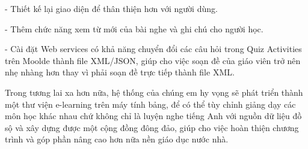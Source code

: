 \quad - Thiết kế lại giao diện để thân thiện hơn với người dùng.

\quad - Thêm chức năng xem từ mới của bài nghe và ghi chú cho người học.

\quad - Cài đặt Web services có khả năng chuyển đổi các câu hỏi trong Quiz Activities trên Moolde thành file XML/JSON, giúp cho việc soạn đề của giáo viên trở nên nhẹ nhàng hơn thay vì phải soạn đề trực tiếp thành file XML.

Trong tương lai xa hơn nữa, hệ thống của chúng em hy vọng sẽ phát triển thành một thư viện e-learning trên máy tính bảng, để có thể tùy chỉnh giảng dạy các môn học khác nhau chứ không chỉ là luyện nghe tiếng Anh với nguồn dữ liệu đồ sộ và xây dựng được một cộng đồng đông đảo, giúp cho việc hoàn thiện chương trình và góp phần nâng cao hơn nữa nền giáo dục nước nhà.

 


